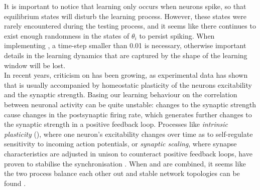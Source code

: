 
It is important to notice that learning only occurs when neurons spike, so that equilibrium states will disturb the learning process. However, these states were rarely encountered during the testing process, and it seems like there continues to exist enough randomness in the states of $\theta_i$ to persist spiking.
When implementing \STDP, a time-step smaller than 0.01 is necessary, otherwise important details in the learning dynamics that are captured by the shape of the learning window will be lost. \\

In recent years, criticism on \STDP has been growing, as experimental data has shown that \STDP is usually accompanied by homeostatic plasticity of the neurons excitability and the synaptic strength. Basing our learning behaviour on the correlation between neuronal activity can be quite unstable: changes to the synaptic strength cause changes in the postsynaptic firing rate, which generates further changes to the synaptic strength in a positive feedback loop. Processes like \textsl{intrinsic plasticity} (\IP), where one neuron's excitability changes over time as to self-regulate sensitivity to incoming action potentials, or \textsl{synaptic scaling}, where synapse characteristics are adjusted in unison to counteract positive feedback loops, have proven to stabilise the synchronisation \cite{ChrolCannon2014, Kirkwood2019}. When \STDP and \IP are combined, it seems like the two process balance each other out and stable network topologies can be found \cite{Song2017}.


